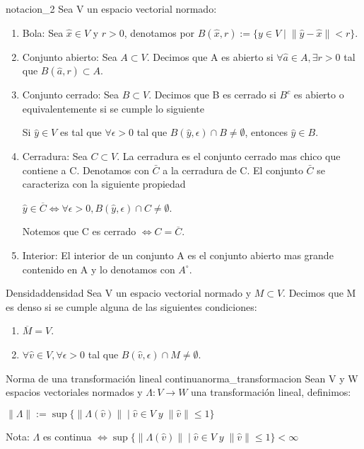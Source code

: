\documentclass[12pt,a4paper]{book}
\providecommand{\norm}[1]{\lVert#1\rVert}
\begin{document}
\begin{notacion}{}{notacion_2}
Sea V un espacio vectorial normado:
\begin{enumerate}
\item Bola: Sea $\widehat{x}\in V$ y $r>0$, denotamos por $B(\widehat{x},r):=\lbrace y\in V\;|\; \norm{\widehat{y}-\widehat{x}}<r \rbrace$.
\\
\item Conjunto abierto: Sea $A\subset V$. Decimos que A es abierto si $\forall \widehat{a}\in A, \exists r>0$ tal que $B(\widehat{a},r)\subset A$. 
\item Conjunto cerrado:  Sea $B\subset V$. Decimos que B es cerrado si $B^{c}$ es abierto o equivalentemente si se cumple lo siguiente
\begin{center}
Si $\widehat{y}\in V$ es tal que $\forall\epsilon >0$ tal que $B(\widehat{y},\epsilon)\cap B\neq\emptyset$, entonces $\widehat{y}\in B$.
\end{center}
\item Cerradura: Sea $C\subset V$. La cerradura es el conjunto cerrado mas chico que contiene a C. Denotamos con $\bar{C}$ a la cerradura de C. El conjunto $\bar{C}$ se caracteriza con la siguiente propiedad
\begin{center}
$\widehat{y}\in\overline{C}\Leftrightarrow \forall\epsilon >0, B(\widehat{y},\epsilon)\cap C\neq\emptyset$.
\end{center}
Notemos que C es cerrado $\Leftrightarrow C=\overline{C}$.
\item Interior: El interior de un conjunto A es el conjunto abierto mas grande contenido en A y lo denotamos con $A^{\circ}$.
\end{enumerate}
\end{notacion}

\smallskip

\begin{definicion}{Densidad}{densidad}
Sea V un espacio vectorial normado y $M\subset V$. Decimos que M es denso si se cumple alguna de las siguientes condiciones:
\begin{enumerate}
\item $\overline{M}=V$.
\item $\forall \widehat{v}\in V, \forall\epsilon >0$ tal que $B(\widehat{v},\epsilon)\cap M\neq\emptyset$.
\end{enumerate}
\end{definicion}

\smallskip

\begin{definicion}{Norma de una transformación lineal continua}{norma_transformacion}
Sean V y W espacios vectoriales normados y $\Lambda :V\rightarrow W$ una transformación lineal, definimos:
\begin{center}
$\norm{\Lambda}:= \sup\lbrace \norm{\Lambda(\widehat{v})}\;|\;\widehat{v}\in V\; y \; \norm{\widehat{v}}\leq 1\rbrace$
\end{center}
Nota: $\Lambda$ es continua $\Leftrightarrow \sup\lbrace \norm{\Lambda(\widehat{v})}\;|\;\widehat{v}\in V\; y \; \norm{\widehat{v}}\leq 1\rbrace <\infty$
\end{definicion}
\end{document}
